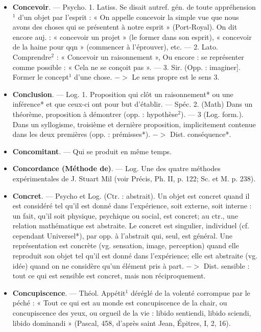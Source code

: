 \begin{itemize}[leftmargin=1cm, label=, itemsep=11pt]
\item {\bf Concevoir}. — Psycho. 1. Latiss. Se
disait autref. gén. de toute appréhension$^1$ d’un objet par l'esprit : « On
appelle concevoir la simple vue que
nous avons des choses qui se présentent
à notre esprit » (Port-Royal).
On dit encore auj. : « concevoir un
projet » (le former dans son esprit),
« concevoir de la haine pour qqn »
(commencer à l’éprouver), etc. —
2. Lato. Comprendre$^2$ : « Concevoir
un raisonnement », Ou encore : se
représenter comme possible : « Cela
ne se conçoit pas ». — 3. Sir. (Opp. :
imaginer]. Former le concept$^1$ d’une
chose. $->$ Le sens propre est le
sens 3.

\item {\bf Conclusion}. — Log. 1. Proposition
qui clôt un raisonnement* ou une
inférence* et que ceux-ci ont pour
but d'établir. — Spéc. 2. (Math)
Dans un théorème, proposition à
démontrer (opp. : hypothèse$^2$). —
3 (Log. form.). Dans un syllogisme, troisième et dernière proposition, implicitement contenue dans
les deux premières (opp. : prémisses*). $->$ Dist. conséquence*.

\item {\bf Concomitant}. — Qui se produit en
même temps.

\item {\bf Concordance (Méthode de)}. — Log.
Une des quatre méthodes expérimentales de J. Stuart Mil (voir
Précis, Ph. II, p. 122; Sc. et M.
p. 238).

\item {\bf Concret}. — Psycho et Log. (Ctr. :
abstrait). Un objet est concret quand
il est considéré tel qu'il est donné
dans l’expérience, soit externe, soit
interne : un fait, qu'il soit physique,
psychique ou social, est concret; au
ctr., une relation mathématique est
abstraite. Le concret est singulier,
individuel (cf. cependant Universel*),
par opp. à l’abstrait qui, seul, est
général. Une représentation est concrète (vg. sensation, image, perception) quand elle reproduit son
objet tel qu'il est donné dans l’expérience; elle est abstraite (vg. idée)
quand on ne considère qu’un élément pris à part. $->$ Dist. sensible : tout ce qui est sensible est
concret, mais non réciproquement.

\item {\bf Concupiscence}. — Théol. Appétit$^1$ déréglé de la volenté corrompue par
le péché : « Tout ce qui est au
monde est concupiscence de la chair,
ou concupiscence des yeux, ou
orgueil de la vie : libido sentiendi,
libido sciendi, libido dominandi »
(Pascal, 458, d’après saint Jean,
Épitres, I, 2, 16).


\end{itemize}
